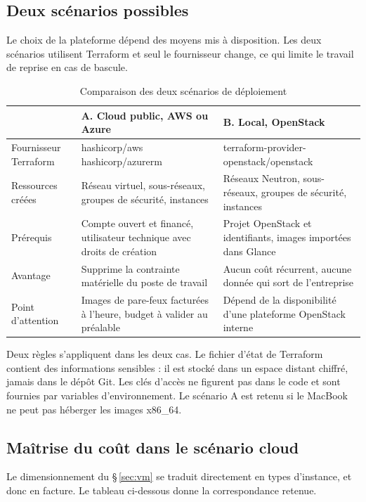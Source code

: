 \documentclass[11pt,a4paper]{article}
\begin{document}
\subsection{Deux scénarios possibles}
Le choix de la plateforme dépend des moyens mis à disposition. Les deux scénarios utilisent Terraform et seul le fournisseur change, ce qui limite le travail de reprise en cas de bascule.

\begin{table}[H]
\centering
\caption{Comparaison des deux scénarios de déploiement}
\begin{tabularx}{\textwidth}{L{2.6cm} Y Y}
\toprule
{} & \textbf{A. Cloud public, AWS ou Azure} & \textbf{B. Local, OpenStack} \\
\midrule
Fournisseur Terraform & \ttfamily hashicorp/aws \newline \ttfamily hashicorp/azurerm & \ttfamily terraform-provider-\newline openstack/openstack \\
Ressources créées & Réseau virtuel, sous-réseaux, groupes de sécurité, instances & Réseaux Neutron, sous-réseaux, groupes de sécurité, instances \\
Prérequis & Compte ouvert et financé, utilisateur technique avec droits de création & Projet OpenStack et identifiants, images importées dans Glance \\
Avantage & Supprime la contrainte matérielle du poste de travail & Aucun coût récurrent, aucune donnée qui sort de l'entreprise \\
Point d'attention & Images de pare-feux facturées à l'heure, budget à valider au préalable & Dépend de la disponibilité d'une plateforme OpenStack interne \\
\bottomrule
\end{tabularx}
\end{table}

Deux règles s'appliquent dans les deux cas. Le fichier d'état de Terraform contient des informations sensibles : il est stocké dans un espace distant chiffré, jamais dans le dépôt Git. Les clés d'accès ne figurent pas dans le code et sont fournies par variables d'environnement. Le scénario A est retenu si le MacBook ne peut pas héberger les images x86\_64.

\subsection{Maîtrise du coût dans le scénario cloud}
Le dimensionnement du \S\,\ref{sec:vm} se traduit directement en types d'instance, et donc en facture. Le tableau ci-dessous donne la correspondance retenue.
\end{document}
